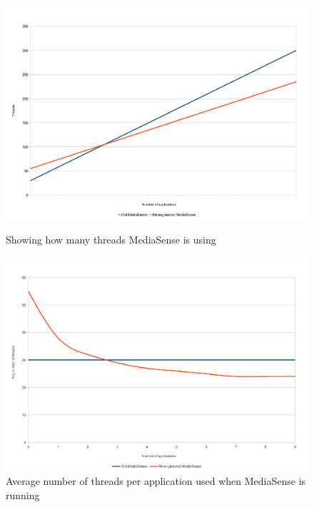 \begin{figure}[H]
		\centering
    	\includegraphics[scale=0.50]{part_7/test_results/threads.pdf}
    	\caption{Showing how many threads MediaSense is using}
    	\includegraphics[scale=0.50]{part_7/test_results/avg_threads.pdf}
    	\caption{Average number of threads per application used when MediaSense is running}
\end{figure}

\clearpage





